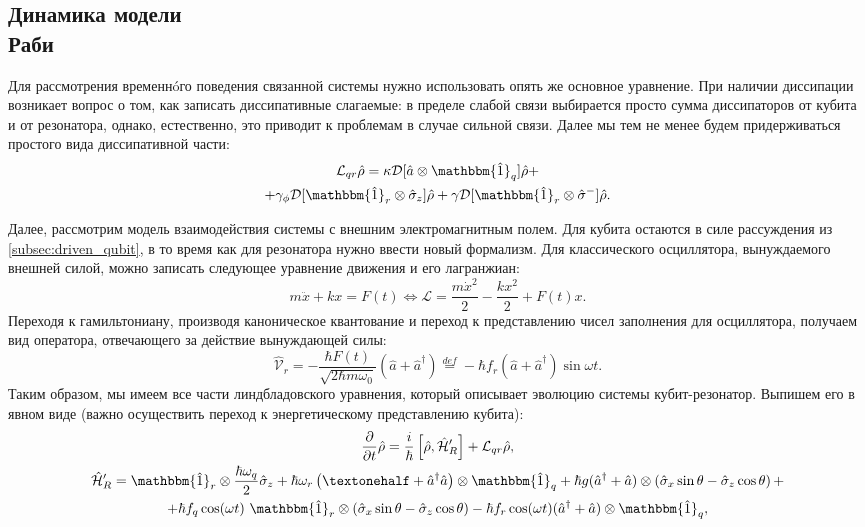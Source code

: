 \documentclass[12pt, twoside]{report}
\numberwithin{equation}{section}
\numberwithin{figure}{section}
\begin{document}
\subsection{Динамика модели\\ Раби} \label{subsec:rabi_specrum_dyn}

Для рассмотрения временнóго поведения связанной системы нужно использовать опять же основное уравнение. При наличии диссипации возникает вопрос о том, как записать диссипативные слагаемые: в пределе слабой связи выбирается просто сумма диссипаторов от кубита и от резонатора, однако, естественно, это приводит к проблемам в случае сильной связи\cite{beaudoin2011}. Далее мы тем не менее будем придерживаться простого вида диссипативной части:
\begin{gather*}
\mathcal{L}_{qr} \hat \rho = \kappa \mathcal{D}[\hat a \otimes \mathbbm{\hat 1}_q]\hat\rho + \\ +\gamma_\phi \mathcal{D}[\mathbbm{\hat 1}_r \otimes \hat \sigma_z]\hat\rho + \gamma\mathcal{D}[\mathbbm{\hat 1}_r \otimes \hat \sigma^-]\hat\rho .
\end{gather*}

Далее, рассмотрим модель взаимодействия системы с внешним электромагнитным полем. Для кубита остаются в силе рассуждения из \autoref{subsec:driven_qubit}, в то время как для резонатора нужно ввести новый формализм.	Для классического осциллятора, вынуждаемого внешней силой, можно записать следующее уравнение движения и его лагранжиан: 
$$m \ddot{x} + k x = F(t) \Leftrightarrow \mathcal{L} = \frac{m \dot{x}^{2}}{2}-\frac{kx^2}{2} + F(t) x .$$
Переходя к гамильтониану, производя каноническое квантование и переход к представлению чисел заполнения для осциллятора, получаем вид оператора, отвечающего за действие вынуждающей силы:
\[
\mathcal{\hat V}_r = -\frac{\hbar F(t)}{\sqrt{2\hbar m \omega_0}} (\hat a + \hat a^{\dag}) \overset{def}{=} - \hbar f_r (\hat a + \hat a^{\dag}) \sin \omega t.
\label{eq:osc_driving_term}
\]
Таким образом, мы имеем все части линдбладовского уравнения, который описывает эволюцию системы кубит-резонатор. Выпишем его в явном виде (важно осуществить переход к энергетическому представлению кубита\cite{ithier2005}):
\begin{gather}
\frac{\partial}{\partial t} \hat \rho= \frac{i}{\hbar}\left[\hat \rho, \mathcal{\hat H}_R^\prime \right] + \mathcal{L}_{qr}\hat \rho, 
\label{eq:master_equation}
\\
\mathcal{\hat H}_R^\prime = \mathbbm{\hat 1}_r \otimes \frac{\hbar \omega_q}{2} \hat \sigma_z  + \hbar \omega_r \left(½ +\hat a^\dag \hat a \right)\otimes \mathbbm{\hat 1}_q + \hbar g (\hat a^\dag + \hat a) \otimes \left( \hat \sigma_x \sin\theta-  \hat\sigma_z \cos\theta \right) + \notag
\\ 
+\hbar f_q \cos(\omega t)~ \mathbbm{\hat 1}_r \otimes \left( \hat \sigma_x \sin\theta -  \hat\sigma_z \cos\theta \right) - \hbar f_r \cos(\omega t) (\hat a^\dag + \hat a)\otimes \mathbbm{\hat 1}_q ,  \notag
\end{gather}
\end{document}
